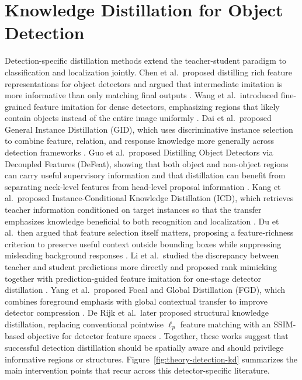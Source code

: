 \section{Knowledge Distillation for Object Detection}

Detection-specific distillation methods extend the teacher-student paradigm to classification and localization jointly. Chen et al.\ proposed distilling rich feature representations for object detectors and argued that intermediate imitation is more informative than only matching final outputs \cite{chen2017learning}. Wang et al.\ introduced fine-grained feature imitation for dense detectors, emphasizing regions that likely contain objects instead of the entire image uniformly \cite{wang2019distilling}. Dai et al.\ proposed General Instance Distillation (GID), which uses discriminative instance selection to combine feature, relation, and response knowledge more generally across detection frameworks \cite{dai2021gid}. Guo et al.\ proposed Distilling Object Detectors via Decoupled Features (DeFeat), showing that both object and non-object regions can carry useful supervisory information and that distillation can benefit from separating neck-level features from head-level proposal information \cite{guo2021defeat}. Kang et al.\ proposed Instance-Conditional Knowledge Distillation (ICD), which retrieves teacher information conditioned on target instances so that the transfer emphasizes knowledge beneficial to both recognition and localization \cite{kang2021icd}. Du et al.\ then argued that feature selection itself matters, proposing a feature-richness criterion to preserve useful context outside bounding boxes while suppressing misleading background responses \cite{du2021frs}. Li et al.\ studied the discrepancy between teacher and student predictions more directly and proposed rank mimicking together with prediction-guided feature imitation for one-stage detector distillation \cite{li2022rank}. Yang et al.\ proposed Focal and Global Distillation (FGD), which combines foreground emphasis with global contextual transfer to improve detector compression \cite{yang2022focal}. De Rijk et al.\ later proposed structural knowledge distillation, replacing conventional pointwise $\ell_p$ feature matching with an SSIM-based objective for detector feature spaces \cite{derijk2022structural}. Together, these works suggest that successful detection distillation should be spatially aware and should privilege informative regions or structures. Figure~\ref{fig:theory-detection-kd} summarizes the main intervention points that recur across this detector-specific literature.

